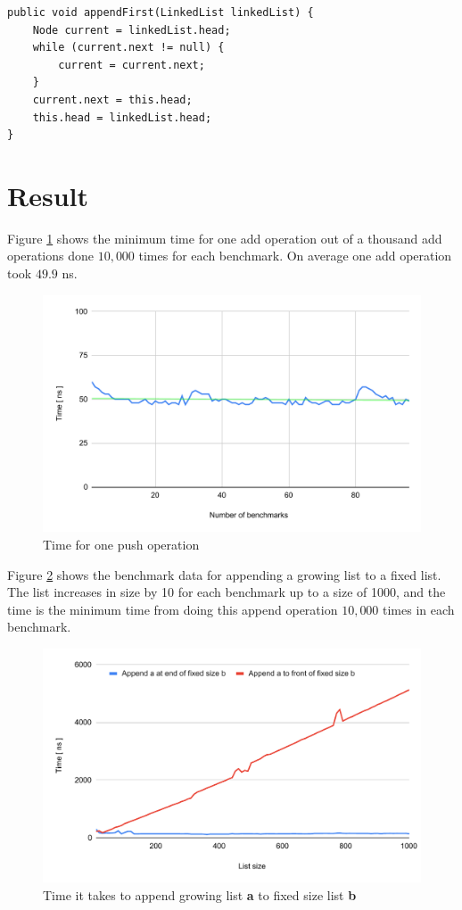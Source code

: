 \documentclass[a4paper,11pt]{article}
\newenvironment{code}{\captionsetup{type=listing}}{}
\begin{document}
\begin{code}
    \label{code:append}
    \begin{verbatim}
public void appendFirst(LinkedList linkedList) {
    Node current = linkedList.head;
    while (current.next != null) {
        current = current.next;
    }
    current.next = this.head;
    this.head = linkedList.head;
}
\end{verbatim}
\end{code}

\FloatBarrier
\section*{Result}
Figure \ref{fig:addOperation} shows the minimum time for one add operation out of a thousand add operations done $10,000$
times for each benchmark. On average one add operation took $49.9$ ns.

\begin{figure}[h]
    \centering
    \includegraphics[width=.8\textwidth]{addOperation.pdf}
    \caption{Time for one push operation}
    \label{fig:addOperation}
\end{figure}

Figure \ref{fig:listAppend} shows the benchmark data for appending a growing list to a fixed list. The list increases in size by
10 for each benchmark up to a size of 1000, and the time is the minimum time from doing this append operation $10,000$ times in
each benchmark.

\begin{figure}[h]
    \centering
    \includegraphics[width=.8\textwidth]{appendList.pdf}
    \caption{Time it takes to append growing list \textbf{a} to fixed size list \textbf{b}}
    \label{fig:listAppend}
\end{figure}
\end{document}
